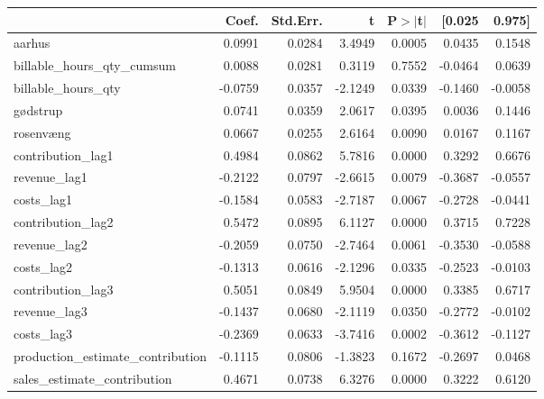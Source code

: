 \begin{table}
\begin{center}
\begin{tabular}{lrrrrrr}
\hline
                                   &   Coef. & Std.Err. &       t & P$> |$t$|$ &  [0.025 &  0.975]  \\
\hline
aarhus                             &  0.0991 &   0.0284 &  3.4949 &      0.0005 &  0.0435 &  0.1548  \\
billable\_hours\_qty\_cumsum       &  0.0088 &   0.0281 &  0.3119 &      0.7552 & -0.0464 &  0.0639  \\
billable\_hours\_qty               & -0.0759 &   0.0357 & -2.1249 &      0.0339 & -0.1460 & -0.0058  \\
gødstrup                           &  0.0741 &   0.0359 &  2.0617 &      0.0395 &  0.0036 &  0.1446  \\
rosenvæng                          &  0.0667 &   0.0255 &  2.6164 &      0.0090 &  0.0167 &  0.1167  \\
contribution\_lag1                 &  0.4984 &   0.0862 &  5.7816 &      0.0000 &  0.3292 &  0.6676  \\
revenue\_lag1                      & -0.2122 &   0.0797 & -2.6615 &      0.0079 & -0.3687 & -0.0557  \\
costs\_lag1                        & -0.1584 &   0.0583 & -2.7187 &      0.0067 & -0.2728 & -0.0441  \\
contribution\_lag2                 &  0.5472 &   0.0895 &  6.1127 &      0.0000 &  0.3715 &  0.7228  \\
revenue\_lag2                      & -0.2059 &   0.0750 & -2.7464 &      0.0061 & -0.3530 & -0.0588  \\
costs\_lag2                        & -0.1313 &   0.0616 & -2.1296 &      0.0335 & -0.2523 & -0.0103  \\
contribution\_lag3                 &  0.5051 &   0.0849 &  5.9504 &      0.0000 &  0.3385 &  0.6717  \\
revenue\_lag3                      & -0.1437 &   0.0680 & -2.1119 &      0.0350 & -0.2772 & -0.0102  \\
costs\_lag3                        & -0.2369 &   0.0633 & -3.7416 &      0.0002 & -0.3612 & -0.1127  \\
production\_estimate\_contribution & -0.1115 &   0.0806 & -1.3823 &      0.1672 & -0.2697 &  0.0468  \\
sales\_estimate\_contribution      &  0.4671 &   0.0738 &  6.3276 &      0.0000 &  0.3222 &  0.6120  \\
\hline
\end{tabular}
\end{center}


\end{table}
